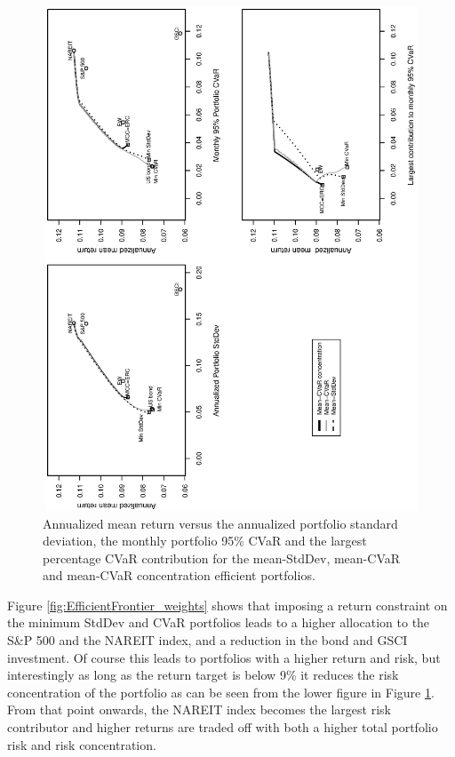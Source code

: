 \documentclass[12pt,a4paper]{article}
\begin{document}
\begin{figure}[tb]
\caption{Annualized mean return versus the annualized portfolio standard deviation, the monthly portfolio 95\% CVaR and the largest percentage CVaR contribution for the mean-StdDev, mean-CVaR and mean-CVaR concentration efficient
portfolios.  \label{fig:EfficientFrontier}}
\includegraphics[width=12cm,height=15cm,angle=270]{frontier_fourassets_tris_clean.eps}
\end{figure}


Figure \ref{fig:EfficientFrontier_weights} shows that imposing a return constraint on the minimum StdDev and CVaR portfolios leads to a higher allocation to the S\&P 500 and the NAREIT index, and a reduction in the bond and GSCI investment. Of course this leads to portfolios with a higher return and risk, but interestingly as long as the return target is below 9\% it reduces the risk concentration of the portfolio as can be seen from the lower figure in Figure \ref{fig:EfficientFrontier}. From that point onwards, the NAREIT index becomes the largest risk contributor and higher returns are traded off with both a higher total portfolio risk and risk concentration. 
\end{document}
